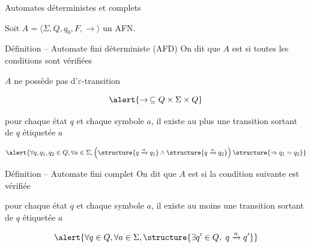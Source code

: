 
\begingroup

\begin{frame}{Automates déterministes et complets}

  Soit $A = \langle \Sigma, Q, q_0, F, \rightarrow \rangle$ un AFN.
  
  \begin{block}{Définition -- Automate fini déterministe (AFD)}
    On dit que $A$ est  si toutes les conditions sont vérifiées
    \begin{description}
    \item[$\varepsilon$-liberté :] $A$ ne possède pas d'$\varepsilon$-transition

      \vspace{-2mm}
      $$\alert{\rightarrow\, \subseteq Q \times \Sigma \times Q}$$

    \item[relation fonctionnelle :] pour chaque état $q$ et chaque symbole $a$, il existe \alert{au plus} une transition sortant de $q$ étiquetée $a$

      \vspace{-2mm}
      $$\alert{\forall q, q_1, q_2\in Q,  \forall a\in \Sigma, \left(\structure{q\xrightarrow{a} q_1} \land \structure{q\xrightarrow{a} q_2}\right) \structure{\Rightarrow q_1 = q_2}}$$
    \end{description}
  \end{block}

  \vspace{-2mm}
  \begin{block}{Définition -- Automate fini complet}
    On dit que $A$ est  si la condition suivante est vérifiée
    \begin{description}
    \item[relation totale :] pour chaque état $q$ et chaque symbole $a$, il existe \alert{au moins} une transition sortant de $q$ étiquetée $a$

      \vspace{-2mm}
      $$\alert{\forall q\in Q,  \forall a\in \Sigma, \structure{\exists q' \in Q,~q \xrightarrow{a} q'}}$$
    \end{description}
  \end{block}
  
\end{frame}

\endgroup
\endinput
